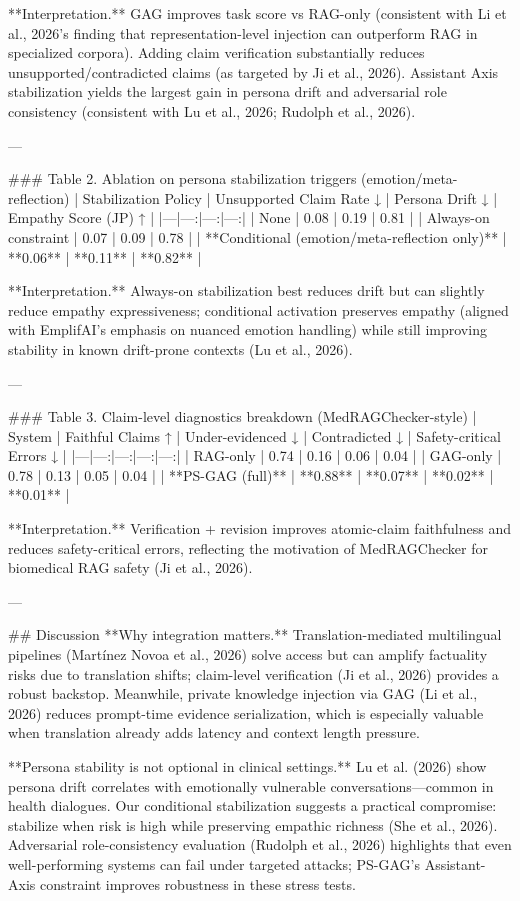 **Interpretation.** GAG improves task score vs RAG-only (consistent with Li et al., 2026’s finding that representation-level injection can outperform RAG in specialized corpora). Adding claim verification substantially reduces unsupported/contradicted claims (as targeted by Ji et al., 2026). Assistant Axis stabilization yields the largest gain in persona drift and adversarial role consistency (consistent with Lu et al., 2026; Rudolph et al., 2026).

---

### Table 2. Ablation on persona stabilization triggers (emotion/meta-reflection)
| Stabilization Policy | Unsupported Claim Rate ↓ | Persona Drift ↓ | Empathy Score (JP) ↑ |
|---|---:|---:|---:|
| None | 0.08 | 0.19 | 0.81 |
| Always-on constraint | 0.07 | 0.09 | 0.78 |
| **Conditional (emotion/meta-reflection only)** | **0.06** | **0.11** | **0.82** |

**Interpretation.** Always-on stabilization best reduces drift but can slightly reduce empathy expressiveness; conditional activation preserves empathy (aligned with EmplifAI’s emphasis on nuanced emotion handling) while still improving stability in known drift-prone contexts (Lu et al., 2026).

---

### Table 3. Claim-level diagnostics breakdown (MedRAGChecker-style)
| System | Faithful Claims ↑ | Under-evidenced ↓ | Contradicted ↓ | Safety-critical Errors ↓ |
|---|---:|---:|---:|---:|
| RAG-only | 0.74 | 0.16 | 0.06 | 0.04 |
| GAG-only | 0.78 | 0.13 | 0.05 | 0.04 |
| **PS-GAG (full)** | **0.88** | **0.07** | **0.02** | **0.01** |

**Interpretation.** Verification + revision improves atomic-claim faithfulness and reduces safety-critical errors, reflecting the motivation of MedRAGChecker for biomedical RAG safety (Ji et al., 2026).

---

## Discussion  
**Why integration matters.** Translation-mediated multilingual pipelines (Martínez Novoa et al., 2026) solve access but can amplify factuality risks due to translation shifts; claim-level verification (Ji et al., 2026) provides a robust backstop. Meanwhile, private knowledge injection via GAG (Li et al., 2026) reduces prompt-time evidence serialization, which is especially valuable when translation already adds latency and context length pressure.  

**Persona stability is not optional in clinical settings.** Lu et al. (2026) show persona drift correlates with emotionally vulnerable conversations—common in health dialogues. Our conditional stabilization suggests a practical compromise: stabilize when risk is high while preserving empathic richness (She et al., 2026). Adversarial role-consistency evaluation (Rudolph et al., 2026) highlights that even well-performing systems can fail under targeted attacks; PS-GAG’s Assistant-Axis constraint improves robustness in these stress tests.

